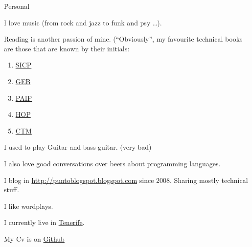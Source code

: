 \documentclass{resume} %
\begin{document}
\begin{rSection}{Personal}

\item I love music (from rock and jazz to funk and psy \ldots).
\item Reading is another passion of mine. (``Obviously'', my favourite
  technical books are those that are known by their initials:
  \begin{enumerate}
  \item \href{https://mitpress.mit.edu/sicp/}{SICP}
  \item \href{https://en.wikipedia.org/wiki/G%C3%B6del,_Escher,_Bach}{GEB}
  \item \href{http://norvig.com/paip.html}{PAIP}
  \item \href{http://hop.perl.plover.com/}{HOP}
  \item \href{https://www.info.ucl.ac.be/~pvr/book.html}{CTM}
  \end{enumerate}
\item I used to play Guitar and bass guitar. (very bad)
\item I also love good conversations over beers about programming
  languages.

\item I blog in \url{http://puntoblogspot.blogspot.com} since
  2008. Sharing mostly technical stuff.
\item I like wordplays.
\item I currently live in \href{https://www.google.es/maps/place/Tenerife/@28.2925426,-17.0803948,9z/data=!3m1!4b1!4m2!3m1!1s0xc4029effe8682ed:0xb01a4bf1c84baf3c}{Tenerife}.
\item My Cv is on \href{https://github.com/kidd/Me}{Github}
\end{rSection}





\end{document}
